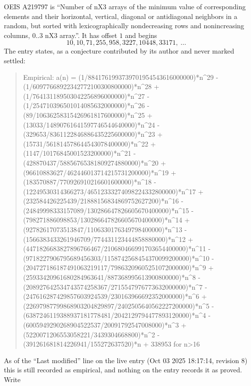 \documentclass[11pt,a4paper]{article}
\theoremstyle{plain}
\theoremstyle{definition}
\begin{document}
OEIS A219797 is ``Number of nX3 arrays of the minimum value of corresponding elements and their horizontal, vertical, diagonal or antidiagonal neighbors in a random, but sorted with lexicographically nondecreasing rows and nonincreasing columns, 0..3 nX3 array.''. It has offset $1$ and begins
\[
10, 10, 71, 255, 958, 3227, 10448, 33171,\ \dots
\]
The entry states, as a conjecture contributed by its author and never marked settled:
\begin{quote}\raggedright\small
Empirical: a(n) = (1/8841761993739701954543616000000)*n\^{}29 - (1/60977668922342772100300800000)*n\^{}28 + (1/764131189503042256896000000)*n\^{}27 - (1/254710396501014085632000000)*n\^{}26 - (89/10636258315426961817600000)*n\^{}25 + (13033/14890761641597746544640000)*n\^{}24 - (329653/8361122846886435225600000)*n\^{}23 + (15731/561814578644543078400000)*n\^{}22 + (1147/10176845001523200000)*n\^{}21 - (428870437/58856765381809274880000)*n\^{}20 + (96610883627/462446013714215731200000)*n\^{}19 + (183570887/770926910216601600000)*n\^{}18 - (12249530314366273/46512333274098224332800000)*n\^{}17 + (232584426225439/21888156834869752627200)*n\^{}16 - (24849998333157089/130286647826605670400000)*n\^{}15 - (798271886098853/130286647826605670400000)*n\^{}14 + (92782617073513847/1106330176349798400000)*n\^{}13 - (1566383433261946709/774431123444858880000)*n\^{}12 + (4471826683827896766467/210680466991703654400000)*n\^{}11 - (9718227906795689456303/1158742568454370099200000)*n\^{}10 - (204727186187491063219117/79863209605251072000000)*n\^{}9 + (25933420961680284963641/887368995613900800000)*n\^{}8 - (208927642534743574258367/2715547976773632000000)*n\^{}7 - (247616287429857603924539/230163966692352000000)*n\^{}6 + (22697987799868903204829897/2402505640562227200000)*n\^{}5 - (6387246119388937181778481/2042129794477893120000)*n\^{}4 - (6005949290268904522537/20091792547008000)*n\^{}3 + (5220071206553058221/3439304668800)*n\^{}2 - (391261681814226941/155272637520)*n + 338953 for n>16
\end{quote}
As of the ``Last modified'' line on the live entry (Oct 03 2025 18:17:14, revision 8) this is still
recorded as empirical, and nothing on the entry records it as proved. Write
\end{document}
